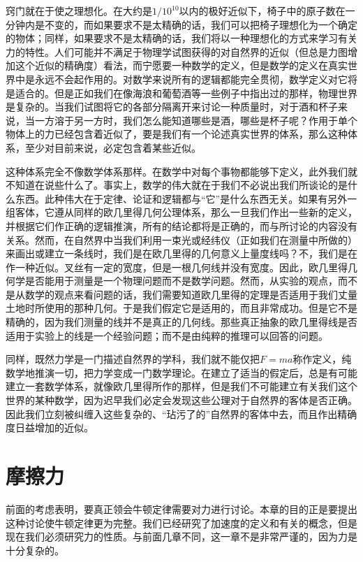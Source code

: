 窍门就在于使之理想化。在大约是$1/10^{10}$以内的极好近似下，椅子中的原子数在一分钟内是不变的，而如果要求不是太精确的话，我们可以把椅子理想化为一个确定的物体；同样，如果要求不是太精确的话，我们将以一种理想化的方式来学习有关力的特性。人们可能并不满足于物理学试图获得的对自然界的近似（但总是力图增加这个近似的精确度）看法，而宁愿要一种数学的定义，但是数学的定义在真实世界中是永远不会起作用的。对数学来说所有的逻辑都能完全贯彻，数学定义对它将是适合的。但是正如我们在像海浪和葡萄酒等一些例子中指出过的那样，物理世界是复杂的。当我们试图将它的各部分隔离开来讨论一种质量时，对于酒和杯子来说，当一方溶于另一方时，我们怎么能知道哪些是酒，哪些是杯子呢？作用于单个物体上的力已经包含着近似了，要是我们有一个论述真实世界的体系，那么这种体系，至少对目前来说，必定包含着某些近似。

这种体系完全不像数学体系那样。在数学中对每个事物都能够下定义，此外我们就不知道在说些什么了。事实上，数学的伟大就在于我们不必说出我们所谈论的是什么东西。此种伟大在于定律、论证和逻辑都与“它”是什么东西无关。如果有另外一组客体，它遵从同样的欧几里得几何公理体系，那么一旦我们作出一些新的定义，并根据它们作正确的逻辑推演，所有的结论都将是正确的，而与所讨论的内容没有关系。然而，在自然界中当我们利用一束光或经纬仪（正如我们在测量中所做的）来画出或建立一条线时，我们是在欧几里得的几何意义上量度线吗？不，我们是在作一种近似。叉丝有一定的宽度，但是一根几何线并没有宽度。因此，欧几里得几何学是否能用于测量是一个物理问题而不是数学问题。然而，从实验的观点，而不是从数学的观点来看问题的话，我们需要知道欧几里得的定理是否适用于我们丈量土地时所使用的那种几何。于是我们假定它是适用的，而且非常成功。但是它不是精确的，因为我们测量的线并不是真正的几何线。那些真正抽象的欧几里得线是否适用于实验上的线是一个经验问题；而不是由纯粹的推理可以回答的问题。

同样，既然力学是一门描述自然界的学科，我们就不能仅把$F=ma$称作定义，纯数学地推演一切，把力学变成一门数学理论。在建立了适当的假定后，总是有可能建立一套数学体系，就像欧几里得所作的那样，但是我们不可能建立有关我们这个世界的某种数学，因为迟早我们必定会发现这些公理对于自然界的客体是否正确。因此我们立刻被纠缠入这些复杂的、“玷污了的”自然界的客体中去，而且作出精确度日益增加的近似。

\section{摩擦力}

前面的考虑表明，要真正领会牛顿定律需要对力进行讨论。本章的目的正是要提出这种讨论使牛顿定律更为完整。我们已经研究了加速度的定义和有关的概念，但是现在我们必须研究力的性质。与前面几章不同，这一章不是非常严谨的，因为力是十分复杂的。

